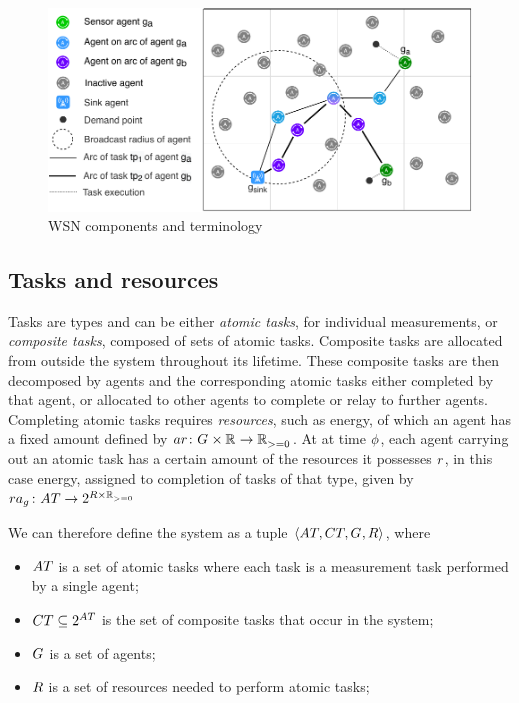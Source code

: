 \newcommand{\formalAgentResources}[2]{
	\functionFormal{ar}
	{\setAgents{}{} \times \setRealNumbers{}{}}
	{\setRealNumbersNonNegative{}{}}
}


\begin{figure}
\centering 
\includegraphics[width=0.9\linewidth, trim={25pt 0pt 24pt 0pt, clip}]{grid_concept}
\caption[WSN deployment terminology]{WSN components and terminology}
\label{fig:grid_concept}
\end{figure}

\subsection{Tasks and resources}

Tasks are types and can be either \textit{atomic tasks}, for individual measurements, or \textit{composite tasks}, composed of sets of atomic tasks. Composite tasks are allocated from outside the system throughout its lifetime. These composite tasks are then decomposed by agents and the corresponding atomic tasks either completed by that agent, or allocated to other agents to complete or relay to further agents. Completing atomic tasks requires \textit{resources}, such as energy, of which an agent has a fixed amount defined by $\formalAgentResources{}{}$. At at time $\phi$, each agent carrying out an atomic task has a certain amount of the resources it possesses $\varResource{}{}$, in this case energy, assigned to completion of tasks of that type, given by $\formalTaskResourceAllocation{}{}$

We can therefore define the system as a tuple $\langle \setAtomicTask{}{}, \setCompositeTask{}{},  \setAgents{}{}, \setResource{}{} \rangle$, where
\begin{itemize}
 \item $\setAtomicTask{}{}$ is a set of atomic tasks where each task is a measurement task performed by a single agent;
 \item $\setCompositeTask{}{} \subseteq \powerSetSymbol{\setAtomicTask{}{}}{}{}$ is the set of composite tasks that occur in the system;
 \item $G_{}^{}$ is a set of agents;
 \item $\setResource{}{}$ is a set of resources needed to perform atomic tasks;
\end{itemize}

